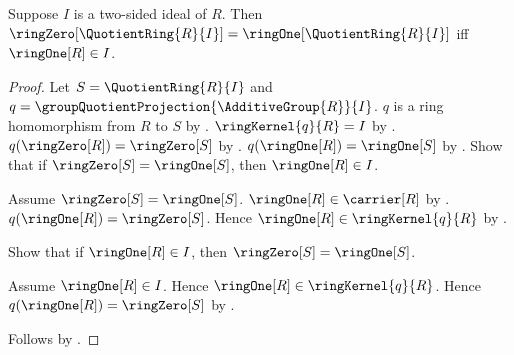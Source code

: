 \begin{theorem}\label{quotient_ring_zero_eq_one_iff}
    Suppose $I$ is a two-sided ideal of $R$.
    Then
        $\ringZero[\QuotientRing{R}{I}]
            =\ringOne[\QuotientRing{R}{I}]$ iff
        $\ringOne[R]\in I$.
\end{theorem}
\begin{proof}
    Let $S=\QuotientRing{R}{I}$ and
        $q=\groupQuotientProjection{\AdditiveGroup{R}}{I}$.
    $q$ is a ring homomorphism from $R$ to $S$ by
        .
    $\ringKernel{q}{R}=I$ by
        .
    $q(\ringZero[R])=\ringZero[S]$ by .
    $q(\ringOne[R])=\ringOne[S]$ by .
    Show that if $\ringZero[S]=\ringOne[S]$, then
        $\ringOne[R]\in I$.
    \begin{subproof}
        Assume $\ringZero[S]=\ringOne[S]$.
        $\ringOne[R]\in\carrier[R]$ by
            .
        $q(\ringOne[R])=\ringZero[S]$.
        Hence $\ringOne[R]\in\ringKernel{q}{R}$ by
            .
    \end{subproof}
    Show that if $\ringOne[R]\in I$, then
        $\ringZero[S]=\ringOne[S]$.
    \begin{subproof}
        Assume $\ringOne[R]\in I$.
        Hence $\ringOne[R]\in\ringKernel{q}{R}$.
        Hence $q(\ringOne[R])=\ringZero[S]$ by
            .
    \end{subproof}
    Follows by \auto.
\end{proof}

